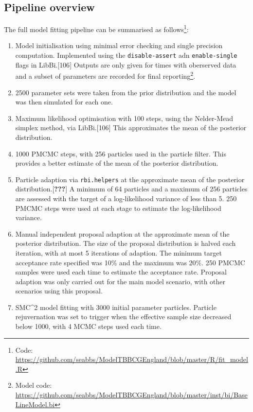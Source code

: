 \documentclass[11pt,twoside]{bristolthesis}
\begin{document}
  \hypertarget{pipeline-overview}{%
  \subsection{Pipeline overview}\label{pipeline-overview}}
  
  The full model fitting pipeline can be summarised as follows\footnote{Code: \url{https://github.com/seabbs/ModelTBBCGEngland/blob/master/R/fit_model.R}}:
  \begin{enumerate}
  \def\labelenumi{\arabic{enumi}.}
  \item
    Model initialisation using minimal error checking and single precision computation. Implemented using the \texttt{disable-assert} adn \texttt{enable-single} flags in LibBi.{[}106{]} Outputs are only given for times with oberserved data and a subset of parameters are recorded for final reporting\footnote{Model code: \url{https://github.com/seabbs/ModelTBBCGEngland/blob/master/inst/bi/BaseLineModel.bi}}.
  \item
    2500 parameter sets were taken from the prior distribution and the model was then simulated for each one.
  \item
    Maximum likelihood optimisation with 100 steps, using the Nelder-Mead simplex method, via LibBi.{[}106{]} This approximates the mean of the posterior distribution.
  \item
    1000 PMCMC steps, with 256 particles used in the particle filter. This provides a better estimate of the mean of the posterior distribution.
  \item
    Particle adaption via \texttt{rbi.helpers} at the approximate mean of the posterior distribution.{[}{\textbf{???}}{]} A minimum of 64 particles and a maximum of 256 particles are assessed with the target of a log-likelihood variance of less than 5. 250 PMCMC steps were used at each stage to estimate the log-likelihood variance.
  \item
    Manual independent proposal adaption at the approximate mean of the posterior distribution. The size of the proposal distribution is halved each iteration, with at most 5 iterations of adaption. The minimum target acceptance rate specified was 10\% and the maximum was 20\%. 250 PMCMC samples were used each time to estimate the acceptance rate. Proposal adaption was only carried out for the main model scenario, with other scenarios using this proposal.
  \item
    SMC\^{}2 model fitting with 3000 initial parameter particles. Particle rejuvernation was set to trigger when the effective sample size decreased below 1000, with 4 MCMC steps used each time.

\end{enumerate}
\end{document}
